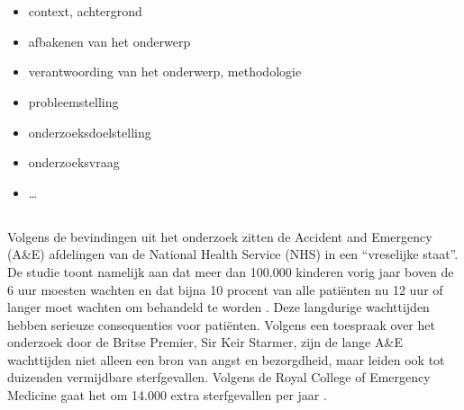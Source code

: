 
\chapter{}%
\label{ch:inleiding}


\begin{itemize}
  \item context, achtergrond
  \item afbakenen van het onderwerp
  \item verantwoording van het onderwerp, methodologie
  \item probleemstelling
  \item onderzoeksdoelstelling
  \item onderzoeksvraag
  \item \ldots
\end{itemize}

\section{}%
\label{sec:probleemstelling}
Volgens de bevindingen uit het onderzoek zitten de Accident and Emergency (A\&E) afdelingen van de National Health Service (NHS) in een “vreselijke staat”. De studie toont namelijk aan dat meer dan 100.000 kinderen vorig jaar boven de 6 uur moesten wachten en dat bijna 10 procent van alle patiënten nu 12 uur of langer moet wachten om behandeld te worden \autocite{LordDarzi2024}. Deze langdurige wachttijden hebben serieuze consequenties voor patiënten. Volgens een toespraak over het onderzoek door de Britse Premier, Sir Keir Starmer, zijn de lange A\&E wachttijden niet alleen een bron van angst en bezorgdheid, maar leiden ook tot duizenden vermijdbare sterfgevallen. Volgens de Royal College of Emergency Medicine gaat het om 14.000 extra sterfgevallen per jaar \autocite{Starmer2024}.


